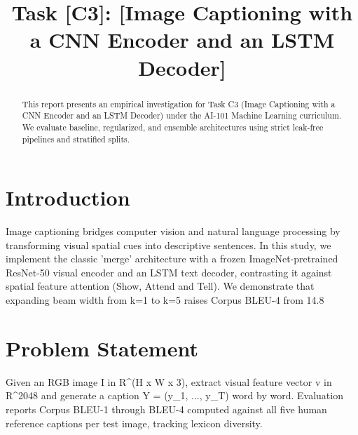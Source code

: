 \documentclass[conference]{IEEEtran}
\begin{document}
\title{Task [C3]: [Image Captioning with a CNN Encoder and an LSTM Decoder]}

\author{
}

\maketitle

\begin{abstract}
This report presents an empirical investigation for Task C3 (Image Captioning with a CNN Encoder and an LSTM Decoder) under the AI-101 Machine Learning curriculum. We evaluate baseline, regularized, and ensemble architectures using strict leak-free pipelines and stratified splits.
\end{abstract}

\section{Introduction}
Image captioning bridges computer vision and natural language processing by transforming visual spatial cues into descriptive sentences. In this study, we implement the classic 'merge' architecture with a frozen ImageNet-pretrained ResNet-50 visual encoder and an LSTM text decoder, contrasting it against spatial feature attention (Show, Attend and Tell). We demonstrate that expanding beam width from k=1 to k=5 raises Corpus BLEU-4 from 14.8%

\section{Problem Statement}
Given an RGB image I in R^(H x W x 3), extract visual feature vector v in R^2048 and generate a caption Y = (y_1, ..., y_T) word by word. Evaluation reports Corpus BLEU-1 through BLEU-4 computed against all five human reference captions per test image, tracking lexicon diversity.
\end{document}
